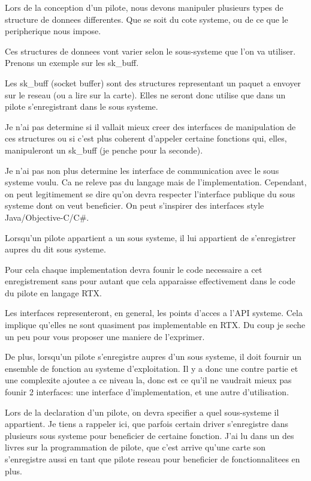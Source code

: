 \documentclass{rtxreport}
\begin{document}
Lors de la conception d'un pilote, nous devons manipuler plusieurs types de
structure de donnees differentes. Que se soit du cote systeme, ou de ce que
le peripherique nous impose.

Ces structures de donnees vont varier selon le sous-systeme que l'on va utiliser.
Prenons un exemple sur les sk\_buff.

Les sk\_buff (socket buffer) sont des structures representant un paquet
a envoyer sur le reseau (ou a lire sur la carte). Elles ne seront donc
utilise que dans un pilote s'enregistrant dans le sous systeme.

Je n'ai pas determine si il vallait mieux creer des interfaces de manipulation
de ces structures ou si c'est plus coherent d'appeler certaine fonctions qui,
elles, manipuleront un sk\_buff (je penche pour la seconde).

Je n'ai pas non plus determine les interface de communication avec le sous
systeme voulu. Ca ne releve pas du langage mais de l'implementation.
Cependant, on peut legitimement se dire qu'on devra respecter l'interface
publique du sous systeme dont on veut beneficier. On peut s'inspirer
des interfaces style Java/Objective-C/C\#.

Lorsqu'un pilote appartient a un sous systeme, il lui
appartient de s'enregistrer aupres du dit sous systeme.

Pour cela chaque implementation devra founir le code
necessaire a cet enregistrement sans pour autant
que cela apparaisse effectivement dans le code
du pilote en langage RTX.

Les interfaces representeront, en general, les points
d'acces a l'API systeme. Cela implique qu'elles
ne sont quasiment pas implementable en RTX. Du
coup je seche un peu pour vous proposer une maniere
de l'exprimer.

De plus, lorsqu'un pilote s'enregistre aupres d'un sous systeme,
il doit fournir un ensemble de fonction au systeme d'exploitation.
Il y a donc une contre partie et une complexite ajoutee a ce niveau la,
donc est ce qu'il ne vaudrait mieux pas founir 2 interfaces:
une interface d'implementation, et une autre d'utilisation.

Lors de la declaration d'un pilote, on devra specifier a quel
sous-systeme il appartient. Je tiens a rappeler ici, que parfois
certain driver s'enregistre dans plusieurs sous systeme pour
beneficier de certaine fonction. J'ai lu dans un des livres
sur la programmation de pilote, que c'est arrive qu'une carte
son s'enregistre aussi en tant que pilote reseau pour beneficier
de fonctionnalitees en plus.
\end{document}
